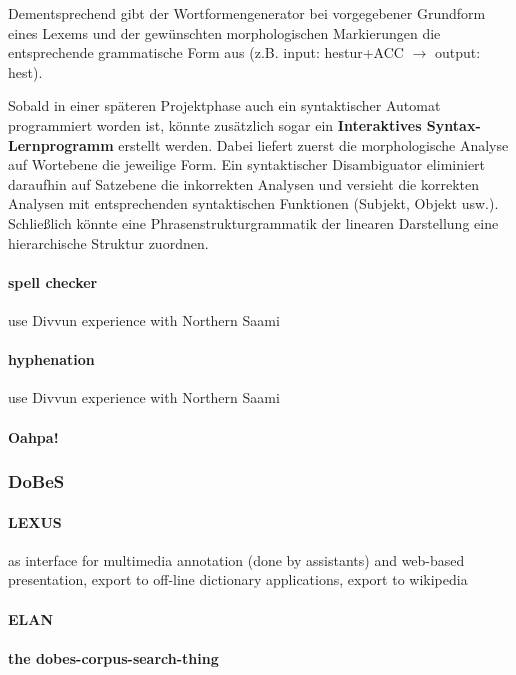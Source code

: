 \documentclass[a4paper,12pt]{article}
\begin{document}
Dementsprechend gibt der Wortformengenerator bei vorgegebener Grundform eines Lexems und der gewünschten morphologischen Markierungen die entsprechende grammatische Form aus (z.B. input: hestur+ACC $\rightarrow$ output: hest).%

Sobald in einer späteren Projektphase auch ein syntaktischer Automat programmiert worden ist, könnte zusätzlich sogar ein \textbf{Interaktives Syntax-Lernprogramm} erstellt werden. Dabei liefert zuerst die morphologische Analyse auf Wortebene die jeweilige Form. Ein syntaktischer Disambiguator eliminiert daraufhin auf Satzebene die inkorrekten Analysen und versieht die korrekten Analysen mit entsprechenden syntaktischen Funktionen (Subjekt, Objekt usw.). Schließlich könnte eine Phrasenstrukturgrammatik der linearen Darstellung eine hierarchische Struktur zuordnen.

\paragraph{spell checker} use Divvun experience with Northern Saami

\paragraph{hyphenation} use Divvun experience with Northern Saami

\paragraph{Oahpa!}

\subsubsection{DoBeS}

\paragraph{LEXUS} as interface for multimedia annotation (done by assistants) and web-based presentation, export to off-line dictionary applications, export to wikipedia

\paragraph{ELAN}

\paragraph{the dobes-corpus-search-thing}
\end{document}
